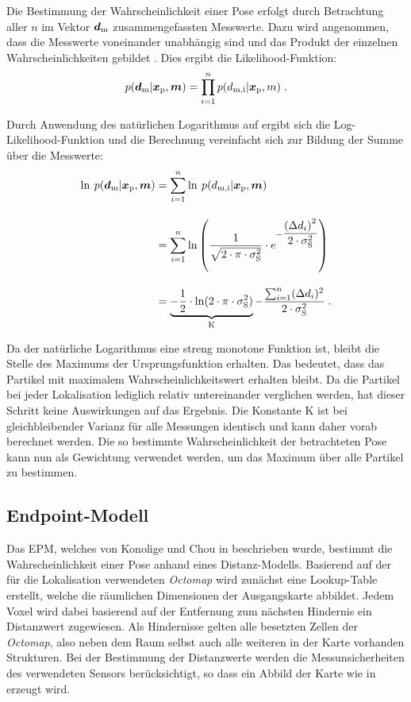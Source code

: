 Die Bestimmung der Wahrscheinlichkeit einer Pose erfolgt durch Betrachtung aller $n$ im Vektor $\mbox{\boldmath{$d$}}_{{\mathrm{m}}}$ zusammengefassten Messwerte. Dazu wird angenommen, dass die Messwerte voneinander unabhängig sind und das Produkt der einzelnen Wahrscheinlichkeiten gebildet \cite{Hornung2010}. Dies ergibt die Likelihood-Funktion:
%
\begin{equation}
\label{eq.likelihood}
p(\mbox{\boldmath{$d$}}_{{\mathrm{m}}}|\mbox{\boldmath{$x$}}_{{\mathrm{p}}},\mbox{\boldmath{$m$}}) = \prod_{i=1}^{n}p(d_{{\mathrm{m,i}}}|\mbox{\boldmath{$x$}}_{{\mathrm{p}}},m) \; \text{.}
\end{equation}

Durch Anwendung des natürlichen Logarithmus auf  ergibt sich die Log-Likelihood-Funktion und die Berechnung vereinfacht sich zur Bildung der Summe über die Messwerte:
%
\begin{equation}
\begin{split}
\ln \: p(\mbox{\boldmath{$d$}}_{{\mathrm{m}}}|\mbox{\boldmath{$x$}}_{{\mathrm{p}}},\mbox{\boldmath{$m$}}) & = \sum_{i=1}^{n} \ln \: p(d_{{\mathrm{m,i}}}|\mbox{\boldmath{$x$}}_{{\mathrm{p}}},\mbox{\boldmath{$m$}}) \\[1em]
& = \sum_{i=1}^{n}\ln \left( \frac{1}{\sqrt{2 \cdot \pi \cdot \sigma_{{\mathrm{S}}}^2}} \cdot e^{-\dfrac{{({\Delta d}_i)}^2}{2 \cdot \sigma_{{\mathrm{S}}}^2}} \right)\\[1em]
& = \underbrace{-\frac{1}{2} \cdot \ln(2 \cdot \pi \cdot\sigma_{{\mathrm{S}}}^2)}_{{\mathrm{K}}}-\dfrac{\sum_{i=1}^{n}({\Delta d}_i)^2}{2 \cdot \sigma_{{\mathrm{S}}}^2}
 \; \text{.} \end{split}
\end{equation}

\prever{
}
Da der natürliche Logarithmus eine streng monotone Funktion ist, bleibt die Stelle des Maximums der Ursprungsfunktion erhalten. Das bedeutet, dass das Partikel mit maximalem Wahrscheinlichkeitswert erhalten bleibt. Da die Partikel bei jeder Lokalisation lediglich relativ untereinander verglichen werden, hat dieser Schritt keine Auswirkungen auf das Ergebnis. Die Konstante $\mathrm{K}$ ist bei gleichbleibender Varianz für alle Messungen identisch und kann daher vorab berechnet werden. Die so bestimmte Wahrscheinlichkeit der betrachteten Pose kann nun als Gewichtung verwendet werden, um das Maximum über alle Partikel zu bestimmen. 

\subsection{Endpoint-Modell}
Das EPM, welches von Konolige und Chou in \cite{Konolige1999} beschrieben wurde, bestimmt die Wahrscheinlichkeit einer Pose anhand eines Distanz-Modells. Basierend auf der für die Lokalisation verwendeten \textit{Octomap} wird zunächst eine Lookup-Table erstellt, welche die räumlichen Dimensionen der Ausgangskarte abbildet. Jedem Voxel wird dabei basierend auf der Entfernung zum nächsten Hindernis ein Distanzwert zugewiesen. Als Hindernisse gelten alle besetzten Zellen der \textit{Octomap}, also neben dem Raum selbst auch alle weiteren in der Karte vorhanden Strukturen. Bei der Bestimmung der Distanzwerte werden die Messunsicherheiten des verwendeten Sensors berücksichtigt, so dass ein Abbild der Karte wie in  erzeugt wird.\\

